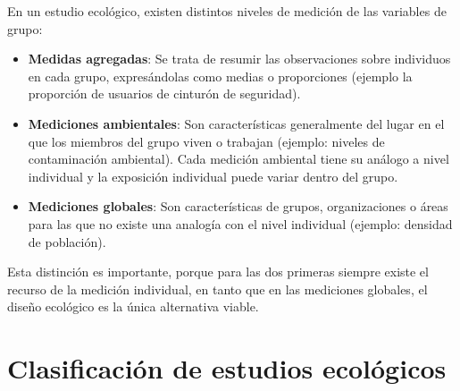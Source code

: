 \documentclass[
  spanish,
  a4paper,
]{scrbook}
\begin{document}
En un estudio ecológico, existen distintos niveles de medición de las
variables de grupo:

\begin{itemize}
\item
  \textbf{Medidas agregadas}: Se trata de resumir las observaciones
  sobre individuos en cada grupo, expresándolas como medias o
  proporciones (ejemplo la proporción de usuarios de cinturón de
  seguridad).
\item
  \textbf{Mediciones ambientales}: Son características generalmente del
  lugar en el que los miembros del grupo viven o trabajan (ejemplo:
  niveles de contaminación ambiental). Cada medición ambiental tiene su
  análogo a nivel individual y la exposición individual puede variar
  dentro del grupo.
\item
  \textbf{Mediciones globales}: Son características de grupos,
  organizaciones o áreas para las que no existe una analogía con el
  nivel individual (ejemplo: densidad de población).
\end{itemize}

Esta distinción es importante, porque para las dos primeras siempre
existe el recurso de la medición individual, en tanto que en las
mediciones globales, el diseño ecológico es la única alternativa viable.

\section{Clasificación de estudios
ecológicos}\label{clasificaciuxf3n-de-estudios-ecoluxf3gicos}
\end{document}
